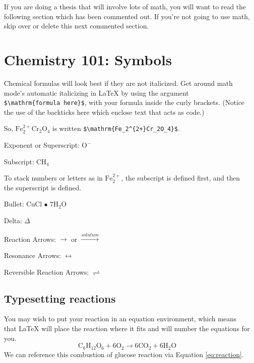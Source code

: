\documentclass[grad,numbers]{coppe}
\begin{document}
  If you are doing a thesis that will involve lots of math, you will want to read the following section which has been commented out. If you're not going to use math, skip over or delete this next commented section.
  
  \hypertarget{chemistry-101-symbols}{%
  \section{Chemistry 101: Symbols}\label{chemistry-101-symbols}}
  
  Chemical formulas will look best if they are not italicized. Get around math mode's automatic italicizing in LaTeX by using the argument \texttt{\$\textbackslash{}mathrm\{formula\ here\}\$}, with your formula inside the curly brackets. (Notice the use of the backticks here which enclose text that acts as code.)
  
  So, \(\mathrm{Fe_2^{2+}Cr_2O_4}\) is written \texttt{\$\textbackslash{}mathrm\{Fe\_2\^{}\{2+\}Cr\_2O\_4\}\$}.
  
  \noindent Exponent or Superscript: \(\mathrm{O^-}\)
  
  \noindent Subscript: \(\mathrm{CH_4}\)
  
  To stack numbers or letters as in \(\mathrm{Fe_2^{2+}}\), the subscript is defined first, and then the superscript is defined.
  
  \noindent Bullet: CuCl \(\bullet\) \(\mathrm{7H_{2}O}\)
  
  \noindent Delta: \(\Delta\)
  
  \noindent Reaction Arrows: \(\longrightarrow\) or \(\xrightarrow{solution}\)
  
  \noindent Resonance Arrows: \(\leftrightarrow\)
  
  \noindent Reversible Reaction Arrows: \(\rightleftharpoons\)
  
  \hypertarget{typesetting-reactions}{%
  \subsection{Typesetting reactions}\label{typesetting-reactions}}
  
  You may wish to put your reaction in an equation environment, which means that LaTeX will place the reaction where it fits and will number the equations for you.
  \begin{equation}
    \mathrm{C_6H_{12}O_6  + 6O_2} \longrightarrow \mathrm{6CO_2 + 6H_2O}
    \label{eq:reaction}
  \end{equation}
  We can reference this combustion of glucose reaction via Equation \eqref{eq:reaction}.
  
\end{document}
